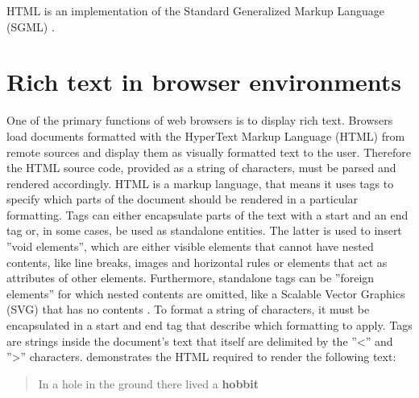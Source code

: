 





HTML is an implementation of the Standard Generalized Markup Language (SGML) \cite{ISO8879}.

\section{Rich text in browser environments}

One of the primary functions of web browsers is to display rich text. Browsers load documents formatted with the HyperText Markup Language (HTML) from remote sources and display them as visually formatted text to the user.
Therefore the HTML source code, provided as a string of characters, must be parsed and rendered accordingly. HTML is a markup language, that means it uses tags to specify which parts of the document should be rendered in a particular formatting. Tags can either encapsulate parts of the text with a start and an end tag or, in some cases, be used as standalone entities. 
The latter is used to insert ''void elements'', which are either visible elements that cannot have nested contents, like line breaks, images and horizontal rules or elements that act as attributes of other elements. Furthermore, standalone tags can be ''foreign elements'' for which nested contents are omitted, like a Scalable Vector Graphics (SVG) that has no contents \cite[Elements]{HTML5}. 
To format a string of characters, it must be encapsulated in a start and end tag that describe which formatting to apply. Tags are strings inside the document's text that itself are delimited by the ''<'' and ''>'' characters.  demonstrates the HTML required to render the following text:

\begin{quotation}
In a hole in the ground there lived a \textbf{hobbit}
\end{quotation}

